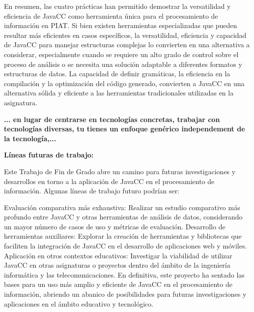 En resumen, las cuatro prácticas han permitido demostrar la versatilidad y eficiencia de JavaCC como herramienta única para el procesamiento de información en PIAT. Si bien existen herramientas especializadas que pueden resultar más eficientes en casos específicos, la versatilidad, eficiencia y capacidad de JavaCC para manejar estructuras complejas lo convierten en una alternativa a considerar, especialmente cuando se requiere un alto grado de control sobre el proceso de análisis o se necesita una solución adaptable a diferentes formatos y estructuras de datos. La capacidad de definir gramáticas, la eficiencia en la compilación y la optimización del código generado, convierten a JavaCC en una alternativa sólida y eficiente a las herramientas tradicionales utilizadas en la asignatura.


\textbf{...
en lugar de centrarse en tecnologías concretas, trabajar con tecnologías diversas, tu tienes un enfoque genérico independement de la tecnología,... }

\phantom{text}

\noindent \textbf{Líneas futuras de trabajo:}

\phantom{text}

Este Trabajo de Fin de Grado abre un camino para futuras investigaciones y desarrollos en torno a la aplicación de JavaCC en el procesamiento de información. Algunas líneas de trabajo futuro podrían ser:

Evaluación comparativa más exhaustiva: Realizar un estudio comparativo más profundo entre JavaCC y otras herramientas de análisis de datos, considerando un mayor número de casos de uso y métricas de evaluación.
Desarrollo de herramientas auxiliares: Explorar la creación de herramientas y bibliotecas que faciliten la integración de JavaCC en el desarrollo de aplicaciones web y móviles.
Aplicación en otros contextos educativos: Investigar la viabilidad de utilizar JavaCC en otras asignaturas o proyectos dentro del ámbito de la ingeniería informática y las telecomunicaciones.
En definitiva, este proyecto ha sentado las bases para un uso más amplio y eficiente de JavaCC en el procesamiento de información, abriendo un abanico de posibilidades para futuras investigaciones y aplicaciones en el ámbito educativo y tecnológico.